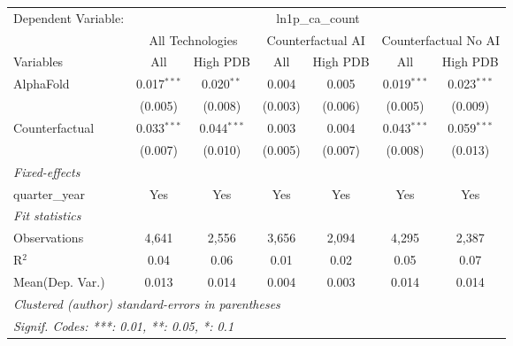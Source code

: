 \begingroup
\centering
\begin{tabular}{lcccccc}
   \tabularnewline \midrule \midrule
   Dependent Variable: & \multicolumn{6}{c}{ln1p\_ca\_count}\\
 & \multicolumn{2}{c}{All Technologies} & \multicolumn{2}{c}{Counterfactual AI} & \multicolumn{2}{c}{Counterfactual No AI} \\
\cmidrule(lr){1-1}\cmidrule(lr){2-3} \cmidrule(lr){4-5} \cmidrule(lr){6-7}
Variables & \multicolumn{1}{c}{All} & \multicolumn{1}{c}{High PDB} & \multicolumn{1}{c}{All} & \multicolumn{1}{c}{High PDB} & \multicolumn{1}{c}{All} & \multicolumn{1}{c}{High PDB} \\
\cmidrule(lr){1-1}\cmidrule(lr){2-2} \cmidrule(lr){3-3} \cmidrule(lr){4-4} \cmidrule(lr){5-5} \cmidrule(lr){6-6} \cmidrule(lr){7-7}
   AlphaFold      & 0.017$^{***}$ & 0.020$^{**}$  & 0.004   & 0.005   & 0.019$^{***}$ & 0.023$^{***}$\\   
                  & (0.005)       & (0.008)       & (0.003) & (0.006) & (0.005)       & (0.009)\\   
   Counterfactual & 0.033$^{***}$ & 0.044$^{***}$ & 0.003   & 0.004   & 0.043$^{***}$ & 0.059$^{***}$\\   
                  & (0.007)       & (0.010)       & (0.005) & (0.007) & (0.008)       & (0.013)\\   
   \midrule
   \emph{Fixed-effects}\\
   quarter\_year  & Yes           & Yes           & Yes     & Yes     & Yes           & Yes\\  
   \midrule
   \emph{Fit statistics}\\
   Observations   & 4,641         & 2,556         & 3,656   & 2,094   & 4,295         & 2,387\\  
   R$^2$          & 0.04          & 0.06          & 0.01    & 0.02    & 0.05          & 0.07\\  
Mean(Dep. Var.) & 0.013 & 0.014 & 0.004 & 0.003 & 0.014 & 0.014 \\
   \midrule \midrule
   \multicolumn{7}{l}{\emph{Clustered (author) standard-errors in parentheses}}\\
   \multicolumn{7}{l}{\emph{Signif. Codes: ***: 0.01, **: 0.05, *: 0.1}}\\
\end{tabular}
\par\endgroup
